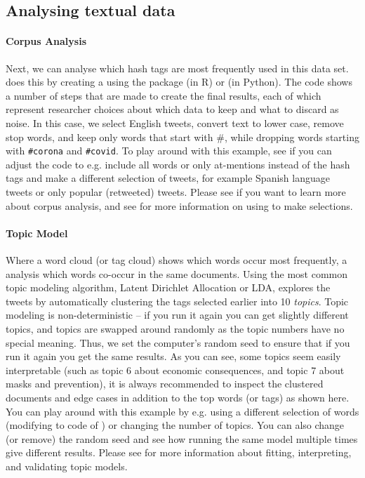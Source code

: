 
\subsection{Analysing textual data}

\paragraph{Corpus Analysis} Next, we can analyse which hash tags are most frequently used in this data set.
 does this by creating a  using the package  (in R)
or \sklearn (in Python).
The code shows a number of steps that are made to create the final results, each of which represent
researcher choices about which data to keep and what to discard as noise.
In this case,  we select English tweets, convert text to lower case, remove stop words, and keep only words that start with \#,
while dropping words starting with \verb+#corona+ and \verb+#covid+.
To play around with this example,
see if you can adjust the code to e.g. include all words or only at-mentions instead of the hash tags
and make a different selection of tweets, for example Spanish language tweets or only popular (retweeted) tweets.
Please see  if you want to learn more about corpus analysis,
and see  for more information on using  to make selections. 


\paragraph{Topic Model}
Where a word cloud (or tag cloud) shows which words occur most frequently,
a  analysis which words co-occur in the same documents.
Using the most common topic modeling algorithm, Latent Dirichlet Allocation or LDA,
 explores the tweets by automatically clustering the tags selected earlier into 10 \emph{topics}.
Topic modeling is non-deterministic -- if you run it again you can get slightly different topics,
and topics are swapped around randomly as the topic numbers have no special meaning.
Thus, we set the computer's random seed to ensure that if you run it again you get the same results.
As you can see, some topics seem easily interpretable (such as topic 6 about economic consequences,
and topic 7 about masks and prevention), it is always recommended to inspect the clustered documents
and edge cases in addition to the top words (or tags) as shown here.
You can play around with this example by e.g. using a different selection of words
(modifying to code of ) or changing the number of topics.
You can also change (or remove) the random seed and see how running the same model multiple times give different results. 
Please see  for more information about fitting, interpreting, and validating topic models.

